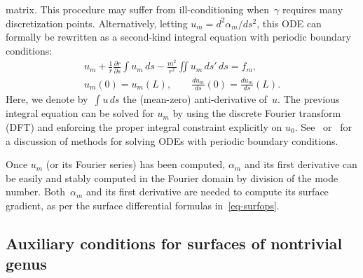 \documentclass[11pt]{article}
\numberwithin{equation}{section}
\begin{document}
matrix. This procedure may suffer from ill-conditioning when~$\gamma$
requires many discretization points.  Alternatively, letting
$u_m = d^2 \alpha_m /d s^2$, this ODE can formally be rewritten as a
second-kind integral equation with periodic boundary conditions:
\begin{equation}
\begin{gathered}
u_m + \frac{1}{r} \frac{\partial r}{\partial s} \int u_m \, ds -
\frac{m^2}{r^2} \iint  u_m \, ds' \, ds = f_m, \\
u_m(0) = u_m(L), \qquad \frac{d u_m}{d s}(0) = 
\frac{d u_m}{d s}(L).
\end{gathered}
\end{equation}
Here, we denote by~$\int u \, ds$ the (mean-zero) anti-derivative of~$u$.  The
previous integral equation can be solved for $u_m$ by using the
discrete Fourier transform (DFT)
and enforcing the proper integral constraint explicitly on
$u_0$. See~\cite{trefethen_spectral_book} or~\cite{wright2015} for a
discussion of methods for solving ODEs with periodic boundary
conditions.

Once $u_m$ (or its Fourier series) has been computed, $\alpha_m$ and
its first derivative can be easily and stably computed in the Fourier
domain by division of the mode number.
Both~$\alpha_m$ and its first derivative are needed to compute
its surface gradient, as per the surface differential
formulas in~\eqref{eq-surfops}.













\subsection{Auxiliary conditions for surfaces of nontrivial genus}
\label{sec_auxiliary}
\end{document}
